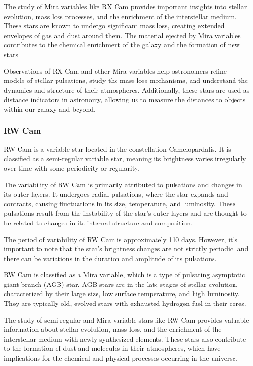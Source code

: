 The study of Mira variables like RX Cam provides important insights into stellar evolution, mass loss processes, and the enrichment of the interstellar medium. These stars are known to undergo significant mass loss, creating extended envelopes of gas and dust around them. The material ejected by Mira variables contributes to the chemical enrichment of the galaxy and the formation of new stars.

Observations of RX Cam and other Mira variables help astronomers refine models of stellar pulsations, study the mass loss mechanisms, and understand the dynamics and structure of their atmospheres. Additionally, these stars are used as distance indicators in astronomy, allowing us to measure the distances to objects within our galaxy and beyond.

\subsubsection*{ RW Cam }
RW Cam is a variable star located in the constellation Camelopardalis. It is classified as a semi-regular variable star, meaning its brightness varies irregularly over time with some periodicity or regularity.

The variability of RW Cam is primarily attributed to pulsations and changes in its outer layers. It undergoes radial pulsations, where the star expands and contracts, causing fluctuations in its size, temperature, and luminosity. These pulsations result from the instability of the star's outer layers and are thought to be related to changes in its internal structure and composition.

The period of variability of RW Cam is approximately 110 days. However, it's important to note that the star's brightness changes are not strictly periodic, and there can be variations in the duration and amplitude of its pulsations.

RW Cam is classified as a Mira variable, which is a type of pulsating asymptotic giant branch (AGB) star. AGB stars are in the late stages of stellar evolution, characterized by their large size, low surface temperature, and high luminosity. They are typically old, evolved stars with exhausted hydrogen fuel in their cores.

The study of semi-regular and Mira variable stars like RW Cam provides valuable information about stellar evolution, mass loss, and the enrichment of the interstellar medium with newly synthesized elements. These stars also contribute to the formation of dust and molecules in their atmospheres, which have implications for the chemical and physical processes occurring in the universe.

